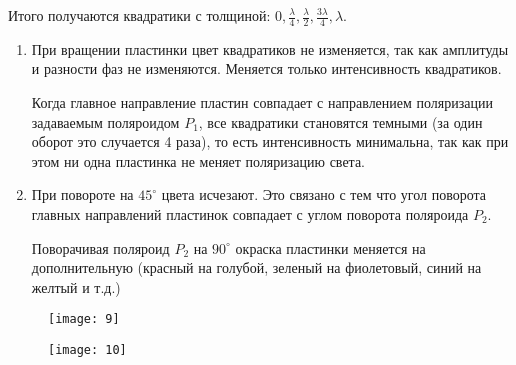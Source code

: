 \documentclass[a4paper, 12pt]{article}
\begin{document}
Итого получаются квадратики с толщиной: $0, \frac{\lambda}{4},
\frac{\lambda}{2}, \frac{3\lambda}{4}, \lambda$. 
\renewcommand{\labelenumi}{\theenumi)}
\renewcommand{\theenumi}{\asbuk{enumi}}
\begin{enumerate}
    \item При вращении
пластинки цвет квадратиков не изменяется, так как амплитуды и
разности фаз не изменяются. Меняется только
интенсивность квадратиков.

Когда главное направление пластин совпадает с направлением
поляризации задаваемым поляроидом $P_1$, все квадратики
становятся темными (за один оборот это случается 4 раза), то есть
интенсивность минимальна, так как
при этом ни одна пластинка не меняет поляризацию света.

\item При повороте на $45^\circ$ цвета исчезают. Это связано с тем что
    угол поворота главных направлений пластинок совпадает с углом
    поворота поляроида $P_2$.

    Поворачивая поляроид $P_2$ на $90^\circ$ окраска пластинки
    меняется на дополнительную (красный на голубой, зеленый на
    фиолетовый, синий на желтый и т.д.)
\end{enumerate}



\begin{figure}[H]
    \begin{floatrow}

        {
        \texttt{[image: 9]}
    }

        {
        \texttt{[image: 10]}
    }
    \end{floatrow}
\end{figure}
\end{document}
